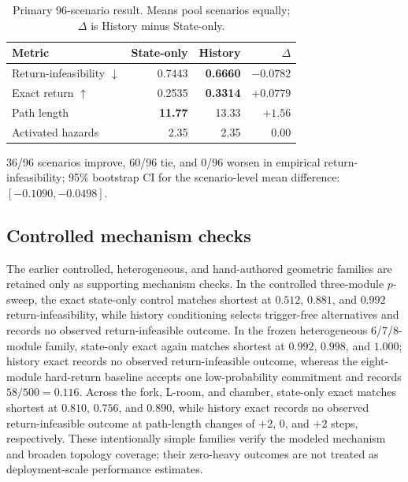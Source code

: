 \documentclass[conference]{IEEEtran}
\begin{document}
\begin{table}[t]
\centering
\caption{Primary 96-scenario result. Means pool scenarios equally; $\Delta$ is History minus State-only.}
\label{tab:primary-unavoidable}
\setlength{\tabcolsep}{4.5pt}
\begin{tabular}{lrrr}
\toprule
Metric & State-only & History & $\Delta$ \\
\midrule
Return-infeasibility $\downarrow$ & 0.7443 & \textbf{0.6660} & \textbf{$-0.0782$} \\
Exact return $\uparrow$ & 0.2535 & \textbf{0.3314} & \textbf{$+0.0779$} \\
Path length & \textbf{11.77} & 13.33 & $+1.56$ \\
Activated hazards & 2.35 & 2.35 & 0.00 \\
\bottomrule
\end{tabular}
\vspace{1mm}

\scriptsize 36/96 scenarios improve, 60/96 tie, and 0/96 worsen in empirical return-infeasibility; 95\% bootstrap CI for the scenario-level mean difference: $[-0.1090,-0.0498]$.
\end{table}

\subsection{Controlled mechanism checks}
The earlier controlled, heterogeneous, and hand-authored geometric families are retained only as supporting mechanism checks. In the controlled three-module $p$-sweep, the exact state-only control matches shortest at $0.512$, $0.881$, and $0.992$ return-infeasibility, while history conditioning selects trigger-free alternatives and records no observed return-infeasible outcome. In the frozen heterogeneous 6/7/8-module family, state-only exact again matches shortest at $0.992$, $0.998$, and $1.000$; history exact records no observed return-infeasible outcome, whereas the eight-module hard-return baseline accepts one low-probability commitment and records $58/500=0.116$. Across the fork, L-room, and chamber, state-only exact matches shortest at $0.810$, $0.756$, and $0.890$, while history exact records no observed return-infeasible outcome at path-length changes of $+2$, $0$, and $+2$ steps, respectively. These intentionally simple families verify the modeled mechanism and broaden topology coverage; their zero-heavy outcomes are not treated as deployment-scale performance estimates.
\end{document}
